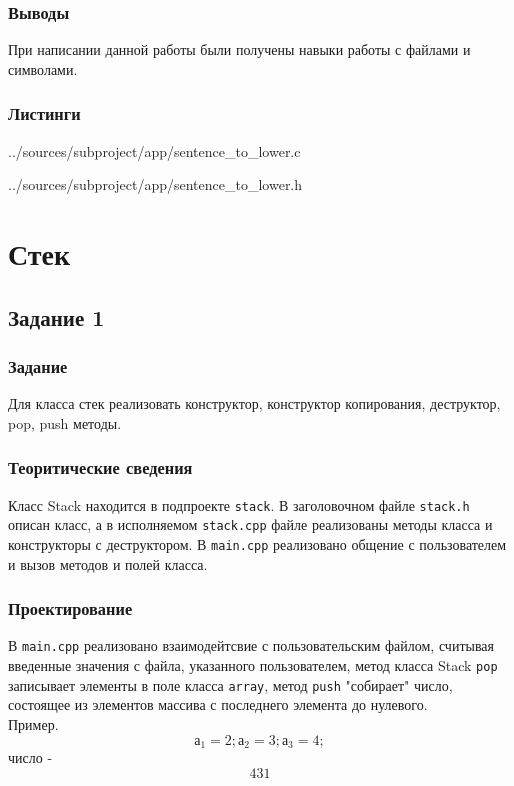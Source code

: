 \documentclass[12pt,a4paper]{report}
\begin{document}
\subsection{Выводы}
При написании данной работы были получены навыки работы с файлами и символами.
\subsection*{Листинги}


{../sources/subproject/app/sentence_to_lower.c}


{../sources/subproject/app/sentence_to_lower.h}
\chapter{Стек}
\section{Задание 1}
\subsection{Задание}
Для класса стек реализовать конструктор, конструктор копирования, деструктор, pop, push методы.
\subsection{Теоритические сведения}
Класс Stack находится в подпроекте \verb+stack+. В заголовочном файле \verb+stack.h+ описан класс, а в исполняемом \verb+stack.cpp+ файле реализованы методы класса и конструкторы с деструктором. В \verb+main.cpp+ реализовано общение с пользователем и вызов методов и полей класса.

\subsection{Проектирование}

В \verb+main.cpp+  реализовано взаимодейтсвие с пользовательским файлом, считывая введенные значения с файла, указанного пользователем, метод класса Stack \verb+pop+ записывает элементы в поле класса \verb+array+, метод \verb+push+ "собирает" число, состоящее из элементов массива с последнего элемента до нулевого.\\
Пример. \begin{equation}
а_1=2; а_2=3; а_3=4;
\end{equation} 
число - \begin{equation}431 \end{equation} 
\end{document}
